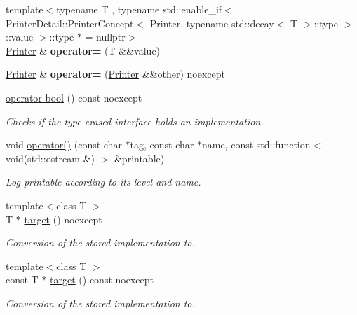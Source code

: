 \begin{DoxyCompactItemize}
\item 
\hypertarget{classSpacy_1_1Log_1_1Printer_ae357ead97367f658a1debecbd541e53f}{{\footnotesize template$<$typename T , typename std\-::enable\-\_\-if$<$ Printer\-Detail\-::\-Printer\-Concept$<$ Printer, typename std\-::decay$<$ T $>$\-::type $>$\-::value $>$\-::type $\ast$  = nullptr$>$ }\\\hyperlink{classSpacy_1_1Log_1_1Printer}{\-Printer} \& {\bfseries operator=} (\-T \&\&value)}\label{classSpacy_1_1Log_1_1Printer_ae357ead97367f658a1debecbd541e53f}

\item 
\hypertarget{classSpacy_1_1Log_1_1Printer_ade7cb7bb9d3a2d530186aedb06fbbe59}{\hyperlink{classSpacy_1_1Log_1_1Printer}{\-Printer} \& {\bfseries operator=} (\hyperlink{classSpacy_1_1Log_1_1Printer}{\-Printer} \&\&other) noexcept}\label{classSpacy_1_1Log_1_1Printer_ade7cb7bb9d3a2d530186aedb06fbbe59}

\item 
\hyperlink{classSpacy_1_1Log_1_1Printer_ae46d1fd573983c31df0f90638120c378}{operator bool} () const noexcept
\begin{DoxyCompactList}\small\item\em \-Checks if the type-\/erased interface holds an implementation. \end{DoxyCompactList}\item 
void \hyperlink{classSpacy_1_1Log_1_1Printer_aeea78f7dde3f0da8e5bdc9b1298d58b3}{operator()} (const char $\ast$tag, const char $\ast$name, const std\-::function$<$ void(std\-::ostream \&) $>$ \&printable)
\begin{DoxyCompactList}\small\item\em \-Log printable according to its level and name. \end{DoxyCompactList}\item 
{\footnotesize template$<$class T $>$ }\\\-T $\ast$ \hyperlink{classSpacy_1_1Log_1_1Printer_ab109ed757887ac804faa40de8acf00c0}{target} () noexcept
\begin{DoxyCompactList}\small\item\em \-Conversion of the stored implementation to. \end{DoxyCompactList}\item 
{\footnotesize template$<$class T $>$ }\\const \-T $\ast$ \hyperlink{classSpacy_1_1Log_1_1Printer_ab909a33cd790ca1c4554d89322605a27}{target} () const noexcept
\begin{DoxyCompactList}\small\item\em \-Conversion of the stored implementation to. \end{DoxyCompactList}\end{DoxyCompactItemize}


